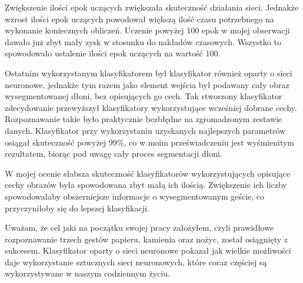 \documentclass[a4paper,12pt,twoside,openany]{report}
\begin{document}
	Zwiększenie ilości epok uczących zwiększała skuteczność działania sieci. Jednakże wzrost ilości epok uczących powodował większą ilość czasu potrzebnego na wykonanie koniecznych obliczeń. Uczenie powyżej 100 epok w mojej obserwacji dawało już zbyt mały zysk w stosunku do nakładów czasowych. Wszystko to spowodowało ustalenie ilości epok uczących na wartość 100.

	Ostatnim wykorzystanym klasyfikatorem był klasyfikator również oparty o sieci neuronowe, jednakże tym razem jako element wejścia był podawany cały obraz wysegmentowanej dłoni, bez opisujących go cech. Tak stworzony klasyfikator zdecydowanie przewyższył klasyfikatory wykorzystujące wcześniej dobrane cechy. Rozpoznawanie takie było praktycznie bezbłędne na zgromadzonym zestawie danych. Klasyfikator przy wykorzystaniu uzyskanych najlepszych parametrów osiągał skuteczność powyżej 99\%, co w moim przeświadczeniu jest wyśmienitym rezultatem, biorąc pod uwagę cały proces segmentacji dłoni.
	 
	W mojej ocenie słabsza skuteczność klasyfikatorów wykorzystujących opisujące cechy obrazów była spowodowana zbyt małą ich ilością. Zwiększenie ich liczby spowodowałaby obszerniejsze informacje o wysegmentowanym geście, co przyczyniłoby się do lepszej klasyfikacji. 
	
	Uważam, że cel jaki na początku swojej  pracy założyłem, czyli prawidłowe rozpoznawanie trzech gestów papieru, kamienia oraz nożyc, został osiągnięty z sukcesem. Klasyfikator oparty o sieci neuronowe pokazał jak wielkie możliwości daje wykorzystanie sztucznych sieci neuronowych, które coraz częściej są wykorzystywane w naszym codziennym życiu.
\end{document}
